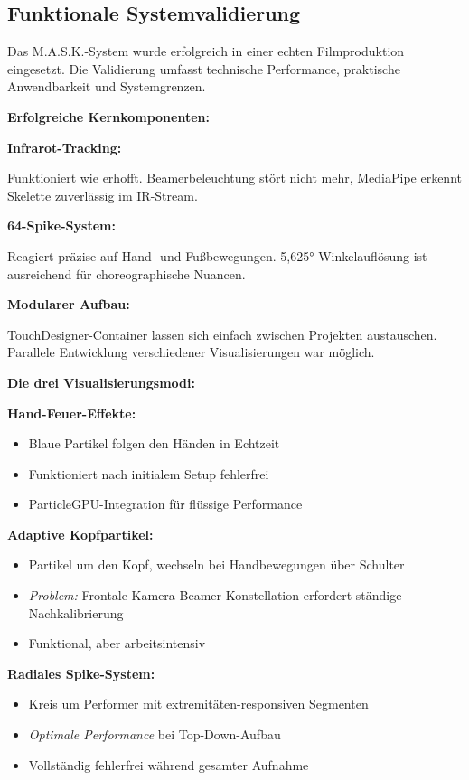 \subsection{Funktionale Systemvalidierung}

Das M.A.S.K.-System wurde erfolgreich in einer echten Filmproduktion eingesetzt. Die Validierung umfasst technische Performance, praktische Anwendbarkeit und Systemgrenzen.

\textbf{Erfolgreiche Kernkomponenten:}

\textbf{Infrarot-Tracking:} \raggedright Funktioniert wie erhofft. Beamerbeleuchtung stört nicht mehr, MediaPipe erkennt Skelette zuverlässig im IR-Stream.

\textbf{64-Spike-System:} \raggedright Reagiert präzise auf Hand- und Fußbewegungen. 5,625° Winkelauflösung ist ausreichend für choreographische Nuancen.

\textbf{Modularer Aufbau:} \raggedright TouchDesigner-Container lassen sich einfach zwischen Projekten austauschen. Parallele Entwicklung verschiedener Visualisierungen war möglich.

\textbf{Die drei Visualisierungsmodi:}

\textbf{Hand-Feuer-Effekte:}
\begin{itemize}
    \item Blaue Partikel folgen den Händen in Echtzeit
    \item Funktioniert nach initialem Setup fehlerfrei
    \item ParticleGPU-Integration für flüssige Performance
\end{itemize}

\textbf{Adaptive Kopfpartikel:}
\begin{itemize}
    \item Partikel um den Kopf, wechseln bei Handbewegungen über Schulter
    \item \textit{Problem:} Frontale Kamera-Beamer-Konstellation erfordert ständige Nachkalibrierung
    \item Funktional, aber arbeitsintensiv
\end{itemize}

\textbf{Radiales Spike-System:}
\begin{itemize}
    \item Kreis um Performer mit extremitäten-responsiven Segmenten
    \item \textit{Optimale Performance} bei Top-Down-Aufbau
    \item Vollständig fehlerfrei während gesamter Aufnahme
\end{itemize}

